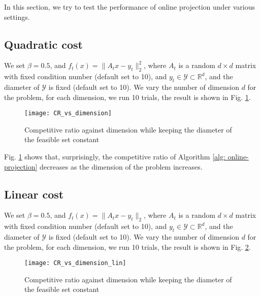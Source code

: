 In this section, we try to test the performance of online projection under various settings. 
\subsection{Quadratic cost}
We set $\beta = 0.5$, and $f_t(x) = \| A_t x - y_t\|_2^2$, where $A_t$ is a random $d \times d$ matrix with fixed condition number (default set to 10), and $y_t \in \mathcal{Y} \subset \mathbb{R}^d$, and the diameter of $\mathcal{Y}$ is fixed (default set to 10). We vary the number of dimension $d$ for the problem, for each dimension, we run 10 trials, the result is shown in Fig. \ref{fig: cr_vs_dim}.  
\begin{figure}[h!]
	\centering
	\texttt{[image: CR\_vs\_dimension]}
	\caption{Competitive ratio against dimension while keeping the diameter of the feasible set constant}
	\label{fig: cr_vs_dim}
\end{figure}
Fig. \ref{fig: cr_vs_dim} shows that, surprisingly, the competitive ratio of Algorithm \ref{alg: online-projection} decreases as the dimension of the problem increases. 

\subsection{Linear cost}
We set $\beta = 0.5$, and $f_t(x) = \| A_t x - y_t\|_2$, where $A_t$ is a random $d \times d$ matrix with fixed condition number (default set to 10), and $y_t \in \mathcal{Y} \subset \mathbb{R}^d$, and the diameter of $\mathcal{Y}$ is fixed (default set to 10). We vary the number of dimension $d$ for the problem, for each dimension, we run 10 trials, the result is shown in Fig. \ref{fig: cr_vs_dim_lin}.
 \begin{figure}[h!]
	\centering
	\texttt{[image: CR\_vs\_dimension\_lin]}
	\caption{Competitive ratio against dimension while keeping the diameter of the feasible set constant}
	\label{fig: cr_vs_dim_lin}
\end{figure}